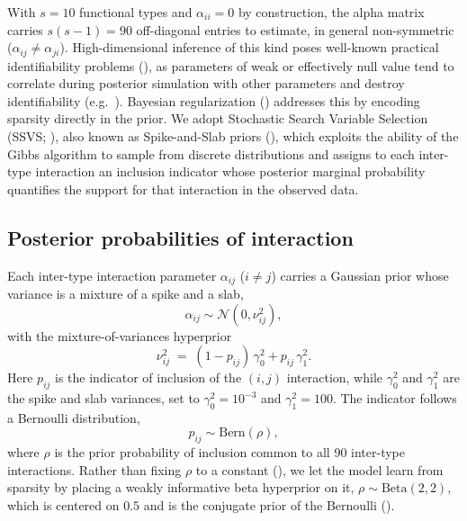 \documentclass[12pt]{article}
\begin{document}
With $s=10$ functional types and $\alpha_{ii}=0$ by construction, the alpha matrix carries $s(s-1)=90$ off-diagonal entries to estimate, in general non-symmetric ($\alpha_{ij}\neq\alpha_{ji}$). High-dimensional inference of this kind poses well-known practical identifiability problems (\citealp{Cole2020}), as parameters of weak or effectively null value tend to correlate during posterior simulation with other parameters and destroy identifiability (e.g.\ \citealp{Machta2013,Chis2016,Cole2020}). Bayesian regularization (\citealp{Mutshinda2011,Almaraz2011,Piironen2017}) addresses this by encoding sparsity directly in the prior. We adopt Stochastic Search Variable Selection (SSVS; \citep{George1993}), also known as Spike-and-Slab priors (\citealp{Piironen2017,Almaraz2021}), which exploits the ability of the Gibbs algorithm to sample from discrete distributions and assigns to each inter-type interaction an inclusion indicator whose posterior marginal probability quantifies the support for that interaction in the observed data.

\subsection{Posterior probabilities of interaction}

Each inter-type interaction parameter $\alpha_{ij}$ ($i\neq j$) carries a Gaussian prior whose variance is a mixture of a spike and a slab,
\begin{equation}\label{inttype_dist}
	\alpha_{ij} \sim \mathcal{N}(0,\nu_{ij}^{2}),
\end{equation}
with the mixture-of-variances hyperprior
\begin{equation}\label{ssvs}
	\nu_{ij}^{2} \;=\; (1-p_{ij})\,\gamma_{0}^{2} + p_{ij}\,\gamma_{1}^{2}.
\end{equation}
Here $p_{ij}$ is the indicator of inclusion of the $(i,j)$ interaction, while $\gamma_{0}^{2}$ and $\gamma_{1}^{2}$ are the spike and slab variances, set to $\gamma_{0}^{2}=10^{-3}$ and $\gamma_{1}^{2}=100$. The indicator follows a Bernoulli distribution,
\begin{equation}\label{dist_bern}
	p_{ij} \sim \mathrm{Bern}(\rho),
\end{equation}
where $\rho$ is the prior probability of inclusion common to all 90 inter-type interactions. Rather than fixing $\rho$ to a constant (\citealp{Almaraz2011,Mutshinda2011}), we let the model learn from sparsity by placing a weakly informative beta hyperprior on it, $\rho\sim\mathrm{Beta}(2,2)$, which is centered on $0.5$ and is the conjugate prior of the Bernoulli (\citealp{Gelman2020,Almaraz2024}).
\end{document}
